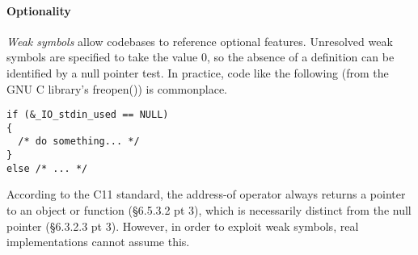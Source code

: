 



\paragraph{Optionality}

\emph{Weak symbols} allow codebases to reference optional features. 
Unresolved weak symbols are specified to take the value 0, so 
the absence of a definition can be identified by a null pointer test.
In practice, code like the following (from the GNU C library's 
\textsf{freopen()}) is commonplace.

{\scriptsize\begin{lstlisting}
if (&_IO_stdin_used == NULL)
{
  /* do something... */
}
else /* ... */
\end{lstlisting}}

According to the C11 standard, the address-of operator 
always returns a pointer to an object or function
(\S 6.5.3.2 pt 3), which is necessarily distinct from the null pointer
(\S6.3.2.3 pt 3).
However, in order to exploit weak symbols, real implementations
cannot assume this.

% 

